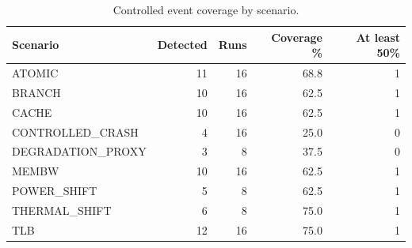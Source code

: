 \begin{table}
\caption{Controlled event coverage by scenario.}
\label{tab:prism_scenario_coverage}
\begin{tabular}{lrrrr}
\toprule
Scenario & Detected & Runs & Coverage \% & At least 50\% \\
\midrule
ATOMIC & 11 & 16 & 68.8 & 1 \\
BRANCH & 10 & 16 & 62.5 & 1 \\
CACHE & 10 & 16 & 62.5 & 1 \\
CONTROLLED\_CRASH & 4 & 16 & 25.0 & 0 \\
DEGRADATION\_PROXY & 3 & 8 & 37.5 & 0 \\
MEMBW & 10 & 16 & 62.5 & 1 \\
POWER\_SHIFT & 5 & 8 & 62.5 & 1 \\
THERMAL\_SHIFT & 6 & 8 & 75.0 & 1 \\
TLB & 12 & 16 & 75.0 & 1 \\
\bottomrule
\end{tabular}
\end{table}
